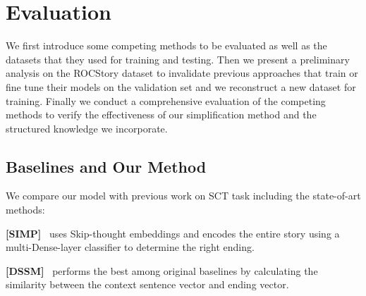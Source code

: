 \section{Evaluation}
\label{sec:experiment}


We first introduce some competing methods to be evaluated as well as
the datasets that they used for training and testing.
Then we present a preliminary analysis on the ROCStory dataset to invalidate
previous approaches that train or fine tune their models on the validation
set and we reconstruct a new dataset for training. Finally we conduct a comprehensive
evaluation of the competing methods to verify the effectiveness of our simplification method and 
the structured knowledge we incorporate.

\subsection{Baselines and Our Method}
\label{sec:baselines}
We compare our model with previous work on SCT task including the 
state-of-art methods: 

\textbf{[SIMP]}~\cite{srinivasan2018simple} uses Skip-thought embeddings and 
encodes the entire story using a multi-Dense-layer classifier to determine the right ending.

\textbf{[DSSM]}~\cite{mostafazadeh2016corpus} performs the best 
among original baselines by calculating  the similarity between the 
context sentence vector and ending vector.

